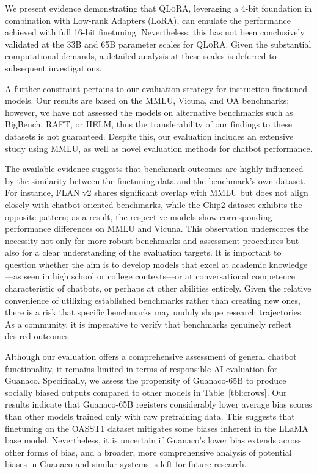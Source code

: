 We present evidence demonstrating that \textsc{QLoRA}, leveraging a 4-bit foundation in combination with Low-rank Adapters (LoRA), can emulate the performance achieved with full 16-bit finetuning. Nevertheless, this has not been conclusively validated at the 33B and 65B parameter scales for \textsc{QLoRA}. Given the substantial computational demands, a detailed analysis at these scales is deferred to subsequent investigations.

A further constraint pertains to our evaluation strategy for instruction-finetuned models. Our results are based on the MMLU, Vicuna, and OA benchmarks; however, we have not assessed the models on alternative benchmarks such as BigBench, RAFT, or HELM, thus the transferability of our findings to these datasets is not guaranteed. Despite this, our evaluation includes an extensive study using MMLU, as well as novel evaluation methods for chatbot performance.

The available evidence suggests that benchmark outcomes are highly influenced by the similarity between the finetuning data and the benchmark’s own dataset. For instance, FLAN v2 shares significant overlap with MMLU but does not align closely with chatbot-oriented benchmarks, while the Chip2 dataset exhibits the opposite pattern; as a result, the respective models show corresponding performance differences on MMLU and Vicuna. This observation underscores the necessity not only for more robust benchmarks and assessment procedures but also for a clear understanding of the evaluation targets. It is important to question whether the aim is to develop models that excel at academic knowledge—as seen in high school or college contexts—or at conversational competence characteristic of chatbots, or perhaps at other abilities entirely. Given the relative convenience of utilizing established benchmarks rather than creating new ones, there is a risk that specific benchmarks may unduly shape research trajectories. As a community, it is imperative to verify that benchmarks genuinely reflect desired outcomes.

Although our evaluation offers a comprehensive assessment of general chatbot functionality, it remains limited in terms of responsible AI evaluation for {Guanaco}. Specifically, we assess the propensity of {Guanaco}-65B to produce socially biased outputs compared to other models in Table~\ref{tbl:crows}. Our results indicate that {Guanaco}-65B registers considerably lower average bias scores than other models trained only with raw pretraining data. This suggests that finetuning on the OASST1 dataset mitigates some biases inherent in the LLaMA base model. Nevertheless, it is uncertain if {Guanaco}'s lower bias extends across other forms of bias, and a broader, more comprehensive analysis of potential biases in {Guanaco} and similar systems is left for future research.

